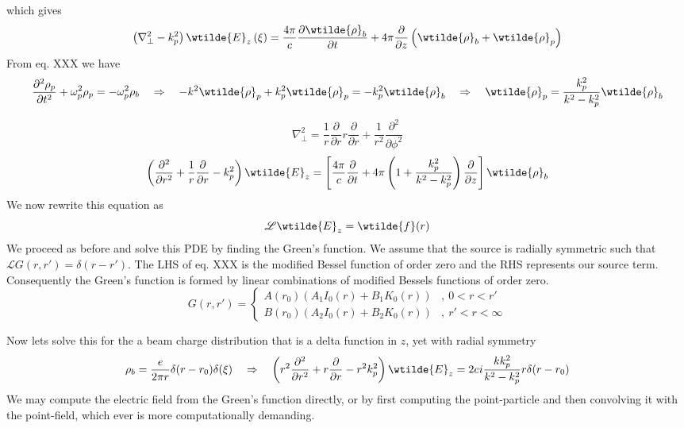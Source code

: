 which gives 
\begin{equation}
\left(\nabla^2_{\perp}-k^2_p\right)\wtilde{E}_z\left(\xi\right)=\frac{4\pi}{c}\frac{\partial \wtilde{\rho}_b}{\partial t}+4\pi\frac{\partial }{\partial z}\left(\wtilde{\rho}_b+\wtilde{\rho}_p\right)
\end{equation}
From eq. XXX we have
\begin{equation}
\frac{\partial^2{\rho}_p}{\partial t^2}+\omega_p^2{\rho}_p=-\omega_p^2{\rho}_b \quad \Rightarrow\quad
-k^2\wtilde{\rho}_p+k_p^2\wtilde{\rho}_p=-k_p^2\wtilde{\rho}_b \quad \Rightarrow\quad \wtilde{\rho}_p=\frac{k_p^2}{k^2-k_p^2}\wtilde{\rho}_b
\end{equation}

\begin{equation}
\nabla_{\perp}^2=\frac{1}{r}\frac{\partial }{\partial r}r\frac{\partial }{\partial r} +\frac{1}{r^2}\frac{\partial^2 }{\partial \phi^2} 
\end{equation}
\begin{equation}
 \left(\frac{\partial^2 }{\partial r^2}+\frac{1}{r}\frac{\partial }{\partial r} -k^2_p\right)\wtilde{E}_z
=\left[\frac{4\pi}{c}\frac{\partial}{\partial t}+4\pi\left(1+\frac{k_p^2}{k^2-k_p^2}\right)\frac{\partial }{\partial z}\right]\wtilde{\rho}_b
\end{equation}
We now rewrite this equation as
\begin{equation}
\mathscr{L}\wtilde{E}_z= \wtilde{f}(r)
\end{equation}
We proceed as before and solve this PDE by finding the Green's function. We assume that the source is radially symmetric such that $\mathscr{L}G(r,r')=\delta(r-r')$. The LHS of eq. XXX is the modified Bessel function of order zero and the RHS represents our source term. Consequently the Green's function is formed by linear combinations of  modified Bessels functions of order zero.
\begin{equation}
G\left(r,r'\right)=\left\{ \begin{array}{ll}
A(r_0)(A_1 I_0(r)+B_1K_0(r)) &,~ 0<r<r'\\
B(r_0)(A_2 I_0(r)+B_2K_0(r))  &,~ r'<r<\infty
\end{array}\right.
\end{equation}


\newpage
Now lets solve this for the a beam charge distribution that is a delta function in $z$, yet with radial symmetry
\begin{equation}
\rho_b=\frac{e}{2\pi r}\delta(r-r_0)\delta(\xi) \quad \Rightarrow\quad  \left(r^2\frac{\partial^2 }{\partial r^2}+r\frac{\partial }{\partial r} -r^2k^2_p\right)\wtilde{E}_z=2ei\frac{kk_p^2}{k^2-k^2_p}r\delta(r-r_0)
\end{equation}
We may compute the electric field from the Green's function directly, or by first computing the point-particle and then convolving it with the point-field, which ever is more computationally demanding. 

